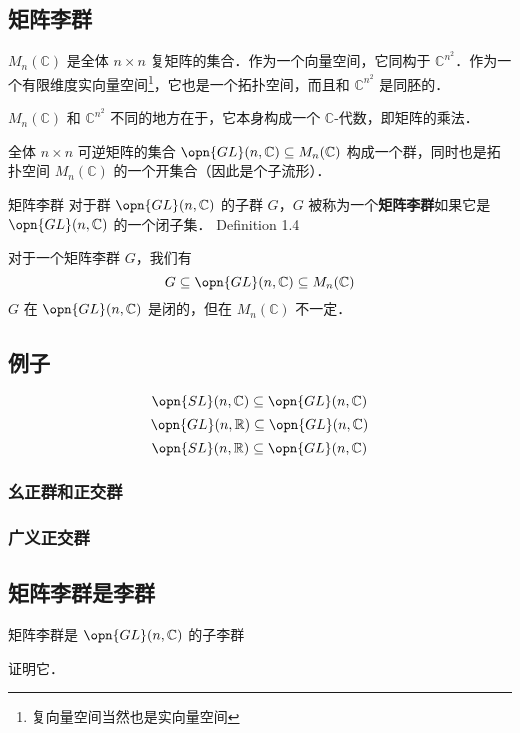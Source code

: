 
\begin{issues}
\issueDraft
\end{issues}


\subsection{矩阵李群}

$M_n(\mathbb{C})$ 是全体 $n \times n$ 复矩阵的集合．作为一个向量空间，它同构于 $\mathbb{C}^{n^2}$．作为一个有限维度实向量空间\footnote{复向量空间当然也是实向量空间}，它也是一个拓扑空间，而且和 $\mathbb{C}^{n^2}$ 是同胚的．

$M_n(\mathbb{C})$ 和 $\mathbb{C}^{n^2}$ 不同的地方在于，它本身构成一个 $\mathbb{C}$-代数，即矩阵的乘法．


全体 $n \times n$ 可逆矩阵的集合 $\opn{GL}(n, \mathbb{C}) \subseteq M_n(\mathbb{C})$ 构成一个群，同时也是拓扑空间 $M_n(\mathbb{C})$ 的一个开集合（因此是个子流形）．

\begin{definition}{矩阵李群}
对于群 $\opn{GL}(n, \mathbb{C})$ 的子群 $G$，$G$ 被称为一个\textbf{矩阵李群}如果它是 $\opn{GL}(n, \mathbb{C})$ 的一个闭子集． Definition 1.4 \cite{GTM222} 
\end{definition}

对于一个矩阵李群 $G$，我们有
$$
G \subseteq \opn{GL}(n, \mathbb{C}) \subseteq M_n(\mathbb{C})
$$
$G$ 在 $\opn{GL}(n, \mathbb{C})$ 是闭的，但在 $M_n(\mathbb{C})$ 不一定．

\subsection{例子}

\begin{example}{}
$$\opn{SL}(n, \mathbb{C}) \subseteq \opn{GL}(n, \mathbb{C})$$
$$\opn{GL}(n, \mathbb{R}) \subseteq \opn{GL}(n, \mathbb{C})$$
$$\opn{SL}(n, \mathbb{R}) \subseteq \opn{GL}(n, \mathbb{C})$$
\end{example}

\subsubsection{幺正群和正交群}
\subsubsection{广义正交群}



\subsection{矩阵李群是李群}

\begin{theorem}{}
矩阵李群是 $\opn{GL}(n, \mathbb{C})$ 的子李群
\end{theorem}

\begin{exercise}{}
证明它．
\end{exercise}